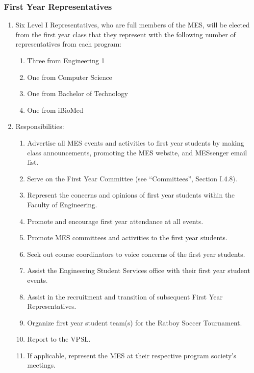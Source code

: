 \hypertarget{first-year-representatives}{%
 \subsubsection{First Year
  Representatives}
 \label{first-year-representatives}}
\begin{enumerate}
 \item
  Six Level I Representatives, who are full members of the MES, will be
  elected from the first year class that they represent with the
  following number of representatives from each program:

  \begin{enumerate}
   \item
    Three from Engineering 1
   \item
    One from Computer Science
   \item
    One from Bachelor of Technology
   \item
    One from iBioMed
  \end{enumerate}
 \item
  Responsibilities:

  \begin{enumerate}
   \item
    Advertise all MES events and activities to first year students by
    making class announcements, promoting the MES website, and MESsenger
    email list.
   \item
    Serve on the First Year Committee (see ``Committees'', Section
    I.4.8).
   \item
    Represent the concerns and opinions of first year students within
    the Faculty of Engineering.
   \item
    Promote and encourage first year attendance at all events.
   \item
    Promote MES committees and activities to the first year students.
   \item
    Seek out course coordinators to voice concerns of the first year
    students.
   \item
    Assist the Engineering Student Services office with their first year
    student events.
   \item
    Assist in the recruitment and transition of subsequent First Year
    Representatives.
   \item
    Organize first year student team(s) for the Ratboy Soccer
    Tournament.
   \item
    Report to the VPSL.
   \item
    If applicable, represent the MES at their respective program
    society's meetings.
  \end{enumerate}
\end{enumerate}

